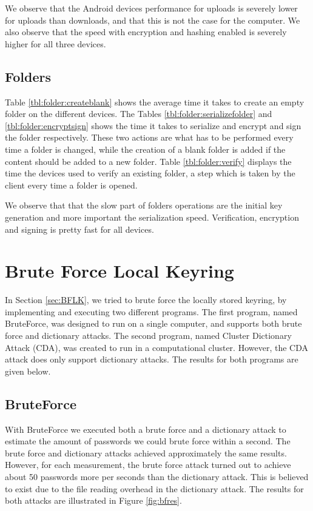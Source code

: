\documentclass[pdftex,english,10pt,b5paper,twoside]{book}
\begin{document}



We observe that the Android devices performance for uploads is severely lower
for uploads than downloads, and that this is not the case for the computer. We
also observe that the speed with encryption and hashing enabled is severely
higher for all three devices.

\subsection{Folders} Table \ref{tbl:folder:createblank} shows the average time
it takes to create an empty folder on the different devices. The Tables
\ref{tbl:folder:serializefolder} and \ref{tbl:folder:encryptsign} shows the
time it takes to serialize and encrypt and sign the folder respectively. These
two actions are what has to be performed every time a folder is changed, while
the creation of a blank folder is added if the content should be added to a new
folder. Table \ref{tbl:folder:verify} displays the time the devices used to
verify an existing folder, a step which is taken by the client every time a
folder is opened.






We observe that that the slow part of folders operations are the initial key
generation and more important the serialization speed. Verification, encryption
and signing is pretty fast for all devices.

\section{Brute Force Local Keyring}
\label{sec:R:BFLK}
In Section \ref{sec:BFLK}, we tried to brute force the locally stored keyring,
by implementing and executing two different programs. The first program, named
BruteForce, was designed to run on a single computer, and supports both brute force and
dictionary attacks. The second program, named Cluster Dictionary Attack (CDA), was created to run in a
computational cluster. However, the CDA attack does only support dictionary attacks. The results for
both programs are given below.

\subsection{BruteForce}
With BruteForce we executed both a brute force and a dictionary attack to estimate the
amount of passwords we could brute force within a second. The brute force
and dictionary attacks achieved approximately the same results. However, for
each measurement, the brute force attack turned out to achieve about 50
passwords more per seconds than the dictionary attack. This is believed to
exist due to the file reading overhead in the dictionary attack. The results for both
attacks are illustrated in Figure \ref{fig:bfres}.
\end{document}
